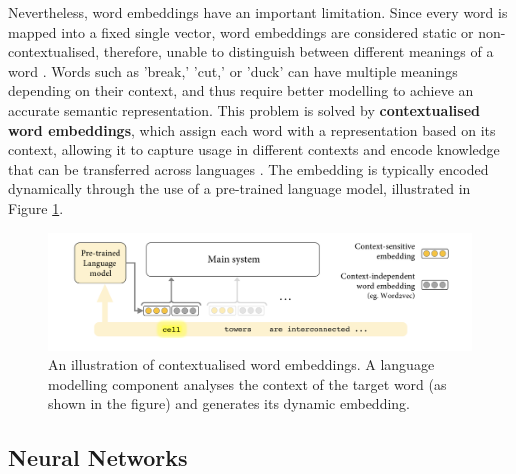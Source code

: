 Nevertheless, word embeddings have an important limitation. Since every word is mapped into a fixed single vector, word embeddings are considered static or non-contextualised, therefore, unable to distinguish between different meanings of a word \cite{camacho-collados-2020-embeddings}. Words such as 'break,' 'cut,' or 'duck' can have multiple meanings depending on their context, and thus require better modelling to achieve an accurate semantic representation. This problem is solved by \textbf{contextualised word embeddings}, which assign each word with a representation based on its context, allowing it to capture usage in different contexts and encode knowledge that can be transferred across languages \cite{liu-2020-survey-contextual-embeddings}. The embedding is typically encoded dynamically through the use of a pre-trained language model, illustrated in Figure \ref{fig:contextualised-word-embeddings}.

\begin{figure}[htbp]
    \centering
    \includegraphics[width=0.9\linewidth]{images/contextualised_word_embeddings.png}
    \caption{An illustration of contextualised word embeddings. A language modelling component analyses the context of the target word (as shown in the figure) and generates its dynamic embedding. \cite{camacho-collados-2020-embeddings}}
    \label{fig:contextualised-word-embeddings}
\end{figure}


\subsection{Neural Networks}

